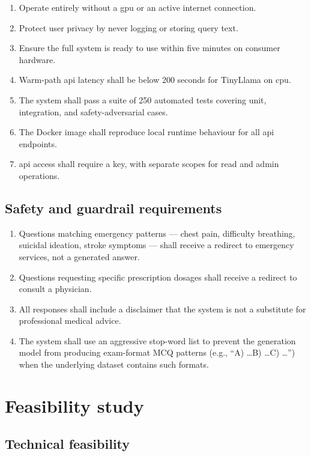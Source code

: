 \begin{enumerate}
    \item Operate entirely without a \ac{gpu} or an active internet connection.
    \item Protect user privacy by never logging or storing query text.
    \item Ensure the full system is ready to use within five minutes on consumer hardware.
    \item Warm-path \ac{api} latency shall be below 200 seconds for TinyLlama on \ac{cpu}.
    \item The system shall pass a suite of 250 automated tests covering unit, integration, and safety-adversarial cases.
    \item The Docker image shall reproduce local runtime behaviour for all \ac{api} endpoints.
    \item \ac{api} access shall require a key, with separate scopes for read and admin operations.
\end{enumerate}

\subsection{Safety and guardrail requirements}

\begin{enumerate}
    \item Questions matching emergency patterns --- chest pain, difficulty breathing, suicidal ideation, stroke symptoms --- shall receive a redirect to emergency services, not a generated answer.
    \item Questions requesting specific prescription dosages shall receive a redirect to consult a physician.
    \item All responses shall include a disclaimer that the system is not a substitute for professional medical advice.
    \item The system shall use an aggressive stop-word list to prevent the generation model from producing exam-format MCQ patterns (e.g., ``A) \ldots B) \ldots C) \ldots'') when the underlying dataset contains such formats.
\end{enumerate}

\section{Feasibility study}

\subsection{Technical feasibility}

